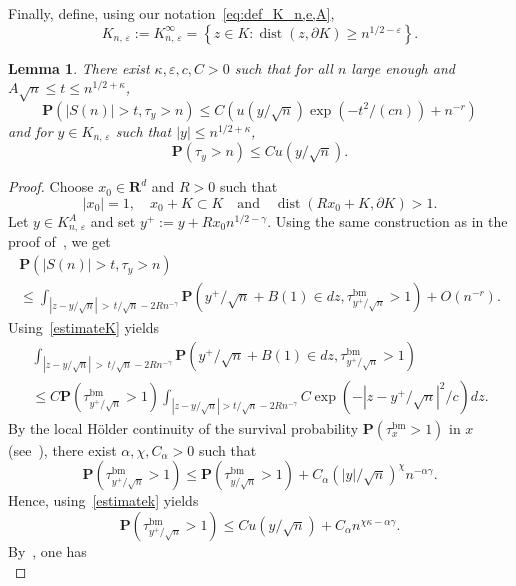 \documentclass[10pt]{amsart}
\newtheorem{lemm}[theo]{Lemma}\newtheorem{prop}[theo]{Proposition}\newtheorem{coro}[theo]{Corollary}\newtheorem{conj}[theo]{Conjecture}
\theoremstyle{definition}\newtheorem{defi}[theo]{Definition}\newtheorem{rema}[theo]{Remark}\newtheorem{exam}[theo]{Example}\newtheorem{exem}[theo]{Example}\newtheorem{nota}[theo]{Notation}
\DeclareMathOperator{\bm}{bm}
\DeclareMathOperator{\dist}{dist}
\newcommand{\pr}{\mathbf{P}}
\newcommand{\bfR}{\mathbf{R}}
\renewcommand{\epsilon}{\varepsilon}
\renewcommand{\leq}{\leqslant}
\renewcommand{\geq}{\geqslant}
\begin{document}
Finally, define, using our notation~\eqref{eq:def_K_n,e,A},
\[
K_{n,\,\epsilon}:=K_{n,\,\epsilon}^{\infty}=\left\{z\in K: \dist\left(z,\partial K\right)\geq n^{1/2-\epsilon}\right\}.
\]

\begin{lemm}\label{distribution_large_range}
There exist $\kappa,\epsilon,c,C>0$ such that for all $n$ large enough and $A\sqrt{n}\leq t\leq n^{1/2+\kappa}$,
\[
\pr\left(|S(n)|>t,\tau_{y}>n\right)\leq C\left(u\left(y/\sqrt{n}\right)\exp\left(-t^{2}/(cn)\right)+n^{-r}\right)
\]
and for $y\in{K}_{n,\,\epsilon}$ such that $| y|\leq n^{1/2+\kappa}$,
\[
\pr\left(\tau_{y}>n\right)\leq Cu\left(y/\sqrt{n}\right).
\]
\end{lemm}


\begin{proof}
Choose $x_{0}\in\bfR^{d}$ and $R>0$ such that
\[
|x_{0}| =1,\quad x_{0}+{K}\subset {K}\quad \text{and}\quad \dist\left(Rx_{0}+{K}, \partial{K}\right)>1.
\]
Let $y\in {K}_{n,\,\epsilon}^{A}$ and set $y^{+}:=y+ Rx_{0}n^{1/2-\gamma}$. Using the same construction as in the proof of~\cite[Lemma~20]{DeWa-15}, we get
\begin{multline*}
\pr\left(|S(n)|>t,\tau_{y}>n\right)\\
\leq \int_{\left|z-y/\sqrt{n}\right|\,>\,t/\sqrt{n}-2Rn^{-\gamma}}\pr\left(y^{+}/\sqrt{n}+B(1)\in dz,\tau_{y^{+}/\sqrt{n}}^{\bm}>1\right)+O\left(n^{-r}\right).
\end{multline*}
Using~\eqref{estimateK} yields
\begin{multline}\label{first_bound_probability_away}
\int_{\left|z-y/\sqrt{n}\right|\,>\,t/\sqrt{n}-2Rn^{-\gamma}}\pr\left(y^{+}/\sqrt{n}+B(1)\in dz,\tau^{\bm}_{y^{+}/\sqrt{n}}>1\right)\\
\leq C\pr\left(\tau^{\bm}_{y^{+}/\sqrt{n}}>1\right)\int_{\left|z-y/\sqrt{n}\right|>t/\sqrt{n}-2Rn^{-\gamma}}C\exp\left(-\left|z-y^{+}/\sqrt{n}\right|^{2}/c\right)dz.
\end{multline}
By the local H\"older continuity of the survival probability $\pr(\tau_{x}^{\bm}>1)$ in $x$ (see~\cite[Proposition~A.1]{RaTa-20}), there exist $\alpha,\chi,C_{\alpha}>0$ such that
\[
\pr\left(\tau^{\bm}_{y^{+}/\sqrt{n}}>1\right)\leq \pr\left(\tau^{\bm}_{y/\sqrt{n}}>1\right)+C_{\alpha}\left(|y|/\sqrt{n}\right)^{\chi}n^{-\alpha\gamma}.
\]
Hence, using~\eqref{estimatek} yields
\[
\pr\left(\tau^{\bm}_{y^{+}/\sqrt{n}}>1\right)\leq Cu(y/\sqrt{n})+C_{\alpha}n^{\chi\kappa-\alpha\gamma}.
\]
By~\cite[Lemma~19]{DeWa-15}, one has
\begin{equation}\label{lowerBoundu}

\end{equation}
\end{proof}
\end{document}
